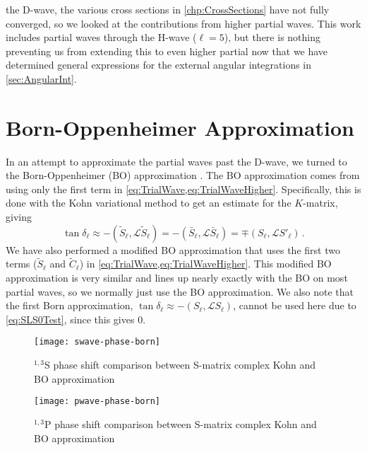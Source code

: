 \documentclass[Dissertation.tex]{subfiles}
\begin{document}
\iftoggle{UNT}{By}{\lettrine{\textcolor{startcolor}{B}}{y}}
the D-wave, the various cross sections in \cref{chp:CrossSections} have not
fully converged, so we looked at the contributions from higher partial waves.
This work includes partial waves through the H-wave ($\ell = 5$), but
there is nothing preventing us from extending this to even higher partial 
now that we have determined general expressions for the 
external angular integrations in \cref{sec:AngularInt}.


\section{Born-Oppenheimer Approximation}
\label{sec:Born}
In an attempt to approximate the partial waves past the D-wave, we turned to 
the Born-Oppenheimer (BO) approximation \cite{Massey1954,Oppenheimer1928,Geltman1969,Mott1965}.
The BO approximation comes from using only the 
first term in \cref{eq:TrialWave,eq:TrialWaveHigher}. Specifically, this is 
done with the Kohn variational method to get an estimate for the $K$-matrix, 
giving \cite[p.720]{Bransden2003}
\begin{equation}
\label{eq:Born}
\tan\delta_\ell \approx -(\widetilde{S}_\ell,\mathcal{L}\widetilde{S}_\ell ) = -(\bar{S}_\ell,\mathcal{L}\bar{S}_\ell ) = \mp(S_\ell,\mathcal{L}S'_\ell ) \,.
\end{equation}
We have also performed a modified BO approximation that uses the first two 
terms ($\widetilde{S}_\ell$ and $\widetilde{C}_\ell$) in \cref{eq:TrialWave,eq:TrialWaveHigher}.
This modified BO approximation is very similar and lines up nearly exactly 
with the BO on most partial waves, so we normally just use the BO
approximation. We also note that the first Born approximation,
$\tan\delta_\ell \approx -(S_\ell,\mathcal{L}S_\ell )$, cannot be used
here due to \cref{eq:SLS0Test}, since this gives 0.

\begin{figure}
	\centering
	\texttt{[image: swave-phase-born]}
	\caption[$^{1,3}$S complex Kohn and BO comparison]{$^{1,3}$S phase shift comparison between S-matrix complex Kohn and BO approximation}
	\label{fig:SWavePhaseBorn}
\end{figure}

\begin{figure}
	\centering
	\texttt{[image: pwave-phase-born]}
	\caption[$^{1,3}$P complex Kohn and BO comparison]{$^{1,3}$P phase shift comparison between S-matrix complex Kohn and BO approximation}
	\label{fig:PWavePhaseBorn}
\end{figure}
\end{document}
